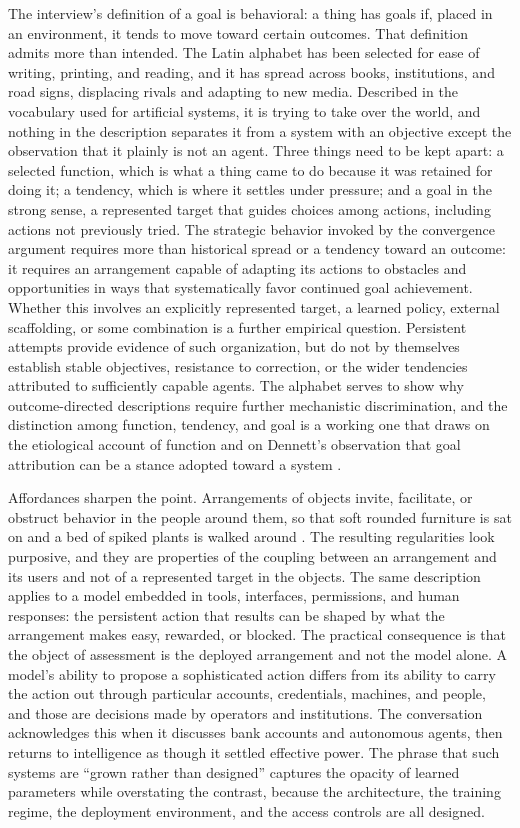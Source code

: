 \documentclass[11pt]{article}
\begin{document}
The interview's definition of a goal is behavioral: a thing has goals if, placed in an environment, it tends to move toward certain outcomes. That definition admits more than intended. The Latin alphabet has been selected for ease of writing, printing, and reading, and it has spread across books, institutions, and road signs, displacing rivals and adapting to new media. Described in the vocabulary used for artificial systems, it is trying to take over the world, and nothing in the description separates it from a system with an objective except the observation that it plainly is not an agent. Three things need to be kept apart: a selected function, which is what a thing came to do because it was retained for doing it; a tendency, which is where it settles under pressure; and a goal in the strong sense, a represented target that guides choices among actions, including actions not previously tried. The strategic behavior invoked by the convergence argument requires more than historical spread or a tendency toward an outcome: it requires an arrangement capable of adapting its actions to obstacles and opportunities in ways that systematically favor continued goal achievement. Whether this involves an explicitly represented target, a learned policy, external scaffolding, or some combination is a further empirical question. Persistent attempts provide evidence of such organization, but do not by themselves establish stable objectives, resistance to correction, or the wider tendencies attributed to sufficiently capable agents. The alphabet serves to show why outcome-directed descriptions require further mechanistic discrimination, and the distinction among function, tendency, and goal is a working one that draws on the etiological account of function \citep{wright1973,millikan1984} and on Dennett's observation that goal attribution can be a stance adopted toward a system \citep{dennett1987}.

Affordances sharpen the point. Arrangements of objects invite, facilitate, or obstruct behavior in the people around them, so that soft rounded furniture is sat on and a bed of spiked plants is walked around \citep{gibson1979}. The resulting regularities look purposive, and they are properties of the coupling between an arrangement and its users and not of a represented target in the objects. The same description applies to a model embedded in tools, interfaces, permissions, and human responses: the persistent action that results can be shaped by what the arrangement makes easy, rewarded, or blocked. The practical consequence is that the object of assessment is the deployed arrangement and not the model alone. A model's ability to propose a sophisticated action differs from its ability to carry the action out through particular accounts, credentials, machines, and people, and those are decisions made by operators and institutions. The conversation acknowledges this when it discusses bank accounts and autonomous agents, then returns to intelligence as though it settled effective power. The phrase that such systems are ``grown rather than designed'' captures the opacity of learned parameters while overstating the contrast, because the architecture, the training regime, the deployment environment, and the access controls are all designed.
\end{document}

